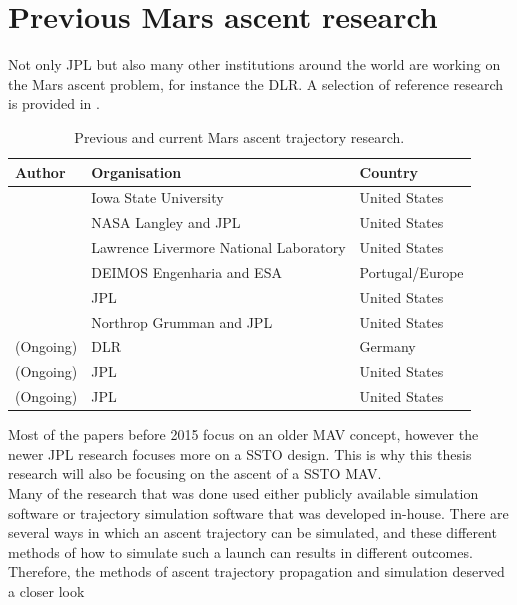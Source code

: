 
\section{Previous Mars ascent research}
\label{sec:previousMarsAscentResearch}
Not only \ac{JPL} but also many other institutions around the world are working on the Mars ascent problem, for instance the \ac{DLR}. A selection of reference research is provided in .

\begin{table}[H]
\begin{center}
\caption{Previous and current Mars ascent trajectory research.}
\label{tab:referenceResearch}
\begin{tabular}{|l|l|l|}
\hline 
\textbf{Author} 	& \textbf{Organisation} & \textbf{Country} \\ \hline \hline
\cite{fanning1996model} & Iowa State University & United States\\ \hline
\cite{desai1998}& NASA Langley and \ac{JPL} & United States \\ \hline
\cite{whitehead2004mars,whitehead2005} & Lawrence Livermore National Laboratory & United States \\ \hline
 \cite{di2007system} & DEIMOS Engenharia and \acs{ESA} & Portugal/Europe \\ \hline
\cite{woolley2011mars} & \ac{JPL} & United States \\ \hline
\cite{trinidad2012} & Northrop Grumman and \ac{JPL} & United States  \\ \hline
\cite{dumont2015design} (Ongoing)& \ac{DLR} 		& Germany \\ \hline
\cite{woolley2015simple} (Ongoing) & \ac{JPL} & United States \\ \hline
\cite{benito2016trajectory} (Ongoing) & \ac{JPL} & United States \\ \hline

\end{tabular}
\end{center}
\end{table}

\noindent
Most of the papers before 2015 focus on an older \ac{MAV} concept, however the newer \ac{JPL} research focuses more on a \ac{SSTO} design. This is why this thesis research will also be focusing on the ascent of a \ac{SSTO} \ac{MAV}. \\
Many of the research that was done used either publicly available simulation software or trajectory simulation software that was developed in-house. There are several ways in which an ascent trajectory can be simulated, and these different methods of how to simulate such a launch can results in different outcomes. Therefore, the methods of ascent trajectory propagation and simulation deserved a closer look



